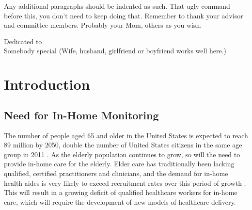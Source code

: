 \documentclass[12pt]{report}
\begin{document}
\setlength{\parindent}{2em}
Any additional paragraphs should be indented as such.  That ugly command before this, you don't need to keep doing that. Remember to thank your advisor and committee members. Probably your Mom, others as you wish. 
%
\newpage
\thispagestyle{plain}
\vspace*{3in}
\begin{center}
Dedicated to\\
Somebody special (Wife, husband, girlfriend or boyfriend works well
here.)
\end{center}
%
%
%
\newpage
\setcounter{page}{1}
\setlength{\parindent}{2em}

\chapter{Introduction}

\section{Need for In-Home Monitoring}
The number of people aged 65 and older in the United States is expected to reach 89 million by 2050, double the number of United States citizens in the same age group in 2011 \cite{Jacobsen2011AmericasPopulation}. As the elderly population continues to grow, so will the need to provide in-home care for the elderly. Elder care has traditionally been lacking qualified, certified practitioners and clinicians, and the demand for in-home health aides is very likely to exceed recruitment rates over this period of growth \cite{Rowe2016PreparingPopulation}. This will result in a growing deficit of qualified healthcare workers for in-home care, which will require the development of new models of healthcare delivery.
\end{document}
